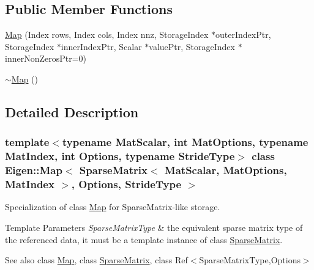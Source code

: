 \subsection*{Public Member Functions}
\begin{DoxyCompactItemize}
\item 
\mbox{\hyperlink{class_eigen_1_1_map_3_01_sparse_matrix_3_01_mat_scalar_00_01_mat_options_00_01_mat_index_01_4_002c859b470cc9e43a031929bd752a93e6_a634ffe6952d21716ca879e107f620f19}{Map}} (Index rows, Index cols, Index nnz, Storage\+Index $\ast$outer\+Index\+Ptr, Storage\+Index $\ast$inner\+Index\+Ptr, Scalar $\ast$value\+Ptr, Storage\+Index $\ast$inner\+Non\+Zeros\+Ptr=0)
\item 
\mbox{\hyperlink{class_eigen_1_1_map_3_01_sparse_matrix_3_01_mat_scalar_00_01_mat_options_00_01_mat_index_01_4_002c859b470cc9e43a031929bd752a93e6_a4d2900fdd8c973d24c4cfb0f0ee4f53f}{$\sim$\+Map}} ()
\end{DoxyCompactItemize}


\subsection{Detailed Description}
\subsubsection*{template$<$typename Mat\+Scalar, int Mat\+Options, typename Mat\+Index, int Options, typename Stride\+Type$>$\newline
class Eigen\+::\+Map$<$ Sparse\+Matrix$<$ Mat\+Scalar, Mat\+Options, Mat\+Index $>$, Options, Stride\+Type $>$}

Specialization of class \mbox{\hyperlink{class_eigen_1_1_map}{Map}} for Sparse\+Matrix-\/like storage. 


\begin{DoxyTemplParams}{Template Parameters}
{\em Sparse\+Matrix\+Type} & the equivalent sparse matrix type of the referenced data, it must be a template instance of class \mbox{\hyperlink{class_eigen_1_1_sparse_matrix}{Sparse\+Matrix}}.\\
\hline
\end{DoxyTemplParams}
\begin{DoxySeeAlso}{See also}
class \mbox{\hyperlink{class_eigen_1_1_map}{Map}}, class \mbox{\hyperlink{class_eigen_1_1_sparse_matrix}{Sparse\+Matrix}}, class Ref$<$\+Sparse\+Matrix\+Type,\+Options$>$ 
\end{DoxySeeAlso}


